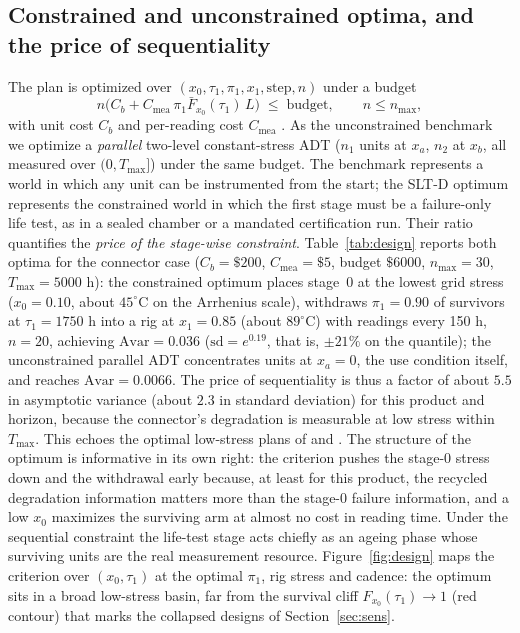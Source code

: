 \documentclass[11pt]{article}
\newcommand{\tmax}{T_{\max}}
\newcommand{\Asvar}{\mathrm{Avar}}
\newcommand{\SLTD}{SLT-D}
\begin{document}
\subsection{Constrained and unconstrained optima, and the price of sequentiality}

The plan is optimized over $(x_0,\tau_1,\pi_1,x_1,\text{step},n)$ under a budget
\begin{equation}\label{eq:budget}
n\big(C_b+C_{\mathrm{mea}}\,\pi_1\bar F_{x_0}(\tau_1)\,L\big)\;\le\;\text{budget},\qquad n\le n_{\max},
\end{equation}
with unit cost $C_b$ and per-reading cost $C_{\mathrm{mea}}$ \citep[cf.][]{Ma2021}. As the
unconstrained benchmark we optimize a \emph{parallel} two-level constant-stress ADT ($n_1$
units at $x_a$, $n_2$ at $x_b$, all measured over $(0,\tmax]$) under the same budget. The
benchmark represents a world in which any unit can be instrumented from the start; the \SLTD{}
optimum represents the constrained world in which the first stage must be a failure-only life
test, as in a sealed chamber or a mandated certification run. Their ratio quantifies the
\emph{price of the stage-wise constraint}. Table~\ref{tab:design} reports both optima for the connector
case ($C_b=\$200$, $C_{\mathrm{mea}}=\$5$, budget $\$6000$, $n_{\max}=30$, $\tmax=5000$ h): the
constrained optimum places stage~0 at the lowest grid stress ($x_0=0.10$, about $45^\circ$C on
the Arrhenius scale), withdraws $\pi_1=0.90$ of survivors at $\tau_1=1750$ h into a rig at
$x_1=0.85$ (about $89^\circ$C) with readings every 150 h, $n=20$, achieving
$\Asvar=0.036$ ($\mathrm{sd}=e^{0.19}$, that is, $\pm21\%$ on the quantile); the
unconstrained parallel ADT concentrates units at $x_a=0$, the use condition itself, and
reaches $\Asvar=0.0066$. The price of sequentiality is thus a factor of about $5.5$ in
asymptotic variance (about $2.3$ in standard deviation) for this product and horizon, because
the connector's degradation is measurable at low stress within $\tmax$. This echoes the
optimal low-stress plans of \citet{Ma2021} and \citet{Ye2014}. The structure of the optimum
is informative in its own right: the criterion pushes the stage-0 stress down and the
withdrawal early because, at least for this product, the recycled degradation information
matters more than the stage-0 failure information, and a low $x_0$ maximizes the surviving arm
at almost no cost in reading time. Under the sequential constraint the life-test stage acts
chiefly as an ageing phase whose surviving units are the real measurement resource.
Figure~\ref{fig:design} maps the criterion over $(x_0,\tau_1)$ at the optimal $\pi_1$, rig
stress and cadence: the optimum sits in a broad low-stress basin, far from the survival cliff
$F_{x_0}(\tau_1)\to1$ (red contour) that marks the collapsed designs of
Section~\ref{sec:sens}.
\end{document}
